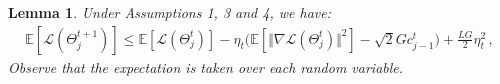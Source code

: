 \documentclass{article}
\newtheorem{lemma}{Lemma}[section]
\begin{document}
\begin{lemma}Under Assumptions 1, 3 and 4, we have:
\begin{align*}
\mathbb{E}[\mathcal{L}(\Theta_j^{t+1})]\leq\mathbb{E}[\mathcal{L}(\Theta_j^{t})]-\eta_t\big(\mathbb{E}[\Vert\nabla\mathcal{L}(\Theta_j^t)\Vert^2]-\sqrt{2}Gc^t_{j-1}\big)+\frac{LG}{2}\eta_t^2\,,
\end{align*}
Observe that the expectation is taken over each random variable.
\end{lemma}
\end{document}

